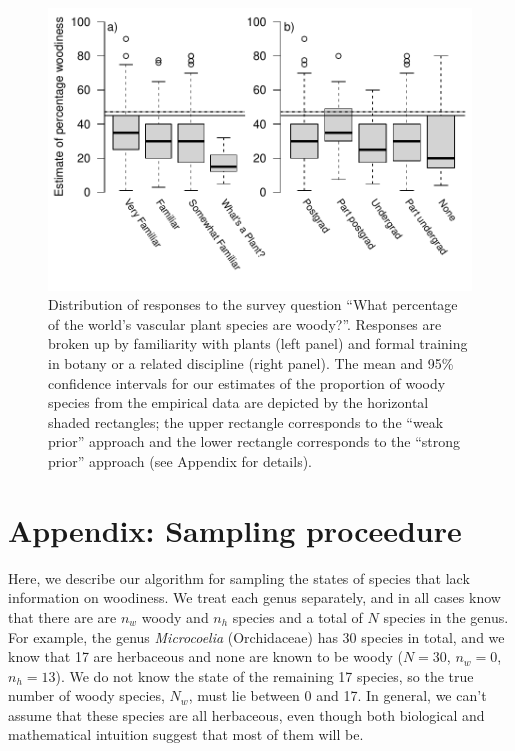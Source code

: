 \documentclass[12pt]{article}
\begin{document}
\begin{figure}[p]
  \centering
  \includegraphics{figs/survey-results}
  \caption{
    Distribution of responses to the survey question ``What percentage
    of the world's vascular plant species are woody?''. Responses are
    broken up by familiarity with plants (left panel) and formal
    training in botany or a related discipline (right panel). The mean
    and 95\% confidence intervals for our estimates of the proportion
    of woody species from the empirical data are depicted by the horizontal
    shaded rectangles; the upper rectangle corresponds to the ``weak
    prior'' approach and the lower rectangle corresponds to the ``strong
    prior'' approach (see Appendix for details).}
  \label{fig:survey}
\end{figure}

\clearpage
\renewcommand\thefigure{S.\arabic{figure}}
\appendix
\section{Appendix: Sampling proceedure}
\setcounter{figure}{0}    

Here, we describe our algorithm for sampling the states of species
that lack information on woodiness.  We treat each genus separately,
and in all cases know that there are are $n_w$ woody and $n_h$ species
and a total of $N$ species in the genus.
%
For example, the genus \textit{Microcoelia} (Orchidaceae) has 30
species in total, and we know that 17 are herbaceous and none are
known to be woody ($N = 30$, $n_w = 0$, $n_h = 13$).  We do not know
the state of the remaining 17 species, so the true number of woody
species, $N_w$, must lie between 0 and 17.  In general, we can't
assume that these species are all herbaceous, even though both
biological and mathematical intuition suggest that most of them will
be.
\end{document}
